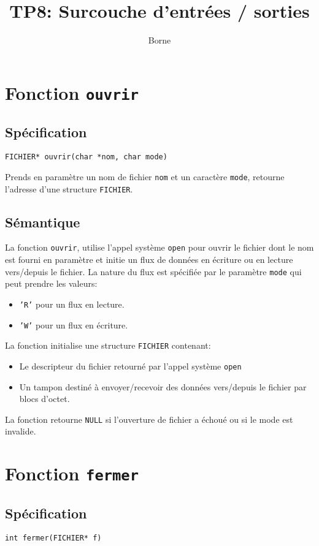 \documentclass[11pt]{article}
\author{Borne}
\date{}
\title{TP8: Surcouche d'entrées / sorties}
\theoremstyle{definition}
\theoremstyle{definition}
\begin{document}
\maketitle


\section{Fonction \texttt{ouvrir}}

\subsection{Spécification}
\texttt{FICHIER* ouvrir(char *nom, char mode)}

Prends en paramètre un nom de fichier \texttt{nom} et un caractère \texttt{mode},
retourne l'adresse d'une structure \texttt{FICHIER}.
\subsection{Sémantique}
La fonction \texttt{ouvrir}, utilise l'appel système \texttt{open} pour ouvrir le fichier dont le nom est fourni en paramètre et initie un flux de données en écriture ou en lecture vers/depuis le fichier. La nature du flux est spécifiée par le paramètre
\texttt{mode} qui peut prendre les valeurs:
\begin{itemize}
\item \texttt{'R'} pour un flux en lecture.
\item \texttt{'W'} pour un flux en écriture.
\end{itemize}
La fonction initialise une structure \texttt{FICHIER} contenant:
\begin{itemize}
\item Le descripteur du fichier retourné par l'appel système \texttt{open}
\item Un tampon destiné à envoyer/recevoir des données vers/depuis
le fichier par blocs d'octet.
\end{itemize}
La fonction retourne \texttt{NULL} si l'ouverture de fichier a échoué ou si le mode
est invalide.




\section{Fonction \texttt{fermer}}
  \subsection{Spécification}
  \texttt{int fermer(FICHIER* f)}
\end{document}
